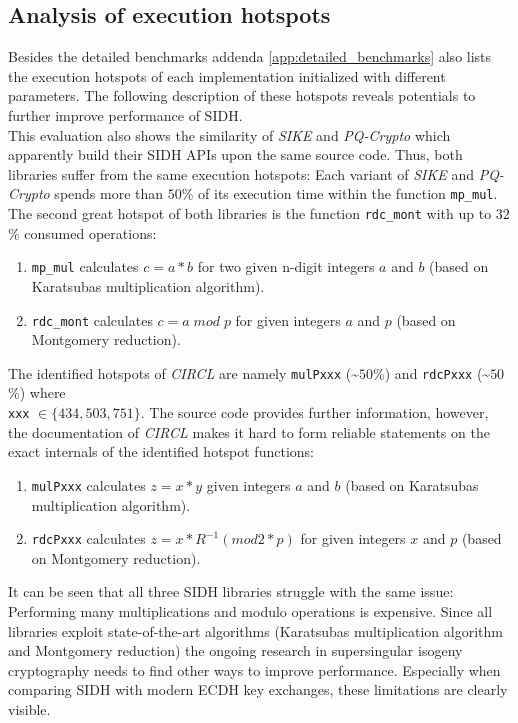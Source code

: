 \subsection{Analysis of execution hotspots}\label{sec:analysis_sidh_hotspots}
Besides the detailed benchmarks addenda \ref{app:detailed_benchmarks} also lists the execution hotspots of each implementation initialized with different parameters. The following description of these hotspots reveals potentials to further improve performance of SIDH.\\
This evaluation also shows the similarity of \textit{SIKE} and \textit{PQ-Crypto} which apparently build their SIDH APIs upon the same source code. Thus, both libraries suffer from the same execution hotspots: Each variant of \textit{SIKE} and \textit{PQ-Crypto} spends more than $50$\% of its execution time within the function \texttt{mp\_mul}. The second great hotspot of both libraries is the function \texttt{rdc\_mont} with up to $32$\% consumed operations:
\begin{enumerate}
\item \texttt{mp\_mul} calculates $c=a*b$ for two given n-digit integers $a$ and $b$ (based on Karatsubas multiplication algorithm).
\item \texttt{rdc\_mont} calculates $c = a\;mod\;p$ for given integers $a$ and $p$ (based on Montgomery reduction).
\end{enumerate}
The identified hotspots of \textit{CIRCL} are namely \texttt{mulPxxx} (\textasciitilde $50$\%) and \texttt{rdcPxxx} (\textasciitilde $50$\%) where \\\texttt{xxx} $\in \{434, 503, 751\}$. The source code provides further information, however, the documentation of \textit{CIRCL} makes it hard to form reliable statements on the exact internals of the identified hotspot functions:
\begin{enumerate}
\item \texttt{mulPxxx} calculates $z=x*y$ given integers $a$ and $b$ (based on Karatsubas multiplication algorithm).
\item \texttt{rdcPxxx} calculates $z = x*R^{-1} (mod 2*p)$ for given integers $x$ and $p$ (based on Montgomery reduction).
\end{enumerate}
It can be seen that all three SIDH libraries struggle with the same issue: Performing many multiplications and modulo operations is expensive. Since all libraries exploit state-of-the-art algorithms (Karatsubas multiplication algorithm and Montgomery reduction) the ongoing research in supersingular isogeny cryptography needs to find other ways to improve performance. Especially when comparing SIDH with modern ECDH key exchanges, these limitations are clearly visible.

